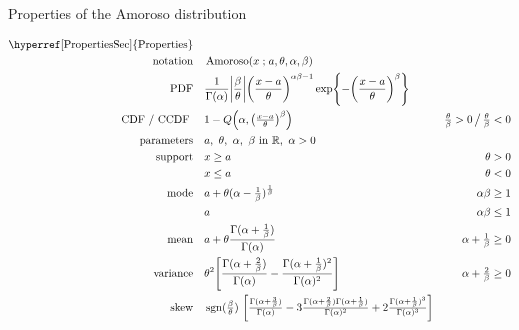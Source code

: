 

\begin{table*}[pt!]

\caption[Amoroso distribution -- Properties]{Properties of the Amoroso distribution}

\begin{align*}
\text{\hyperref[PropertiesSec]{Properties}}  \quad& \\
\text{notation} \quad &  \op{Amoroso}(x\given a, \theta, \alpha, \beta)  \checked
\\
\text{PDF} \quad &
\frac{1}{\Gamma(\alpha)} 
\Left|\frac{\beta}{\theta}\Right|
\Left(\frac{x-a}{\theta}\Right)^{\alpha \beta -1}
\exp \Left\{
-  \Left(\frac{x-a}{\theta}\Right)^{\beta}
\Right\}
\checked
\hspace{-8em}
\\ 
\text{CDF / CCDF } \quad  &    1-Q\Left(\alpha, \Left(\tfrac{x - a }{\theta}\Right)^{\beta}\Right) 
\checked & \tfrac{\theta}{\beta}>0 \, \big/ \,  \tfrac{\theta}{\beta}<0
\\
\text{parameters}\quad &   a,\ \theta,\ \alpha,\ \beta\  \text{in } \Real, \ \alpha>0	\checked
\\
\text{support} \quad &     x \geq a &  \theta > 0 \checked
\\
&   x\leq a  &  \theta < 0 	\checked
\\
\text{mode} \quad&   a+ \theta (\alpha-\tfrac{1}{\beta})^{\frac{1}{\beta}}  \checked
& \alpha \beta  \geq 1		\checked
\\ & a & \alpha \beta  \le 1
\\
\text{mean} \quad& a  + \theta \frac{\Gamma(\alpha+\frac{1}{\beta})}{\Gamma(\alpha)}  \checked
& \alpha + \tfrac{1}{\beta} \geq 0
\\
\text{variance}  \quad&   \theta^2 \Left[  \frac{\Gamma(\alpha+\frac{2}{\beta})}{\Gamma(\alpha)}  - 
\frac{\Gamma(\alpha+\frac{1}{\beta})^2}{\Gamma(\alpha)^2}    \Right] \checked
& \alpha + \tfrac{2}{\beta} \geq 0
\\
\text{skew} \quad  &  \op{sgn}(\tfrac{\beta}{\theta})\ \Left[  \tfrac{\Gamma(\alpha+\frac{3}{\beta})}{\Gamma(\alpha)} - 3 \tfrac{\Gamma(\alpha+\frac{2}{\beta})\Gamma(\alpha+\frac{1}{\beta})}{\Gamma(\alpha)^2}    + 2  \tfrac{\Gamma(\alpha+\frac{1}{\beta})^3}{\Gamma(\alpha)^3}   \Right]

\end{align*}
\end{table*}

